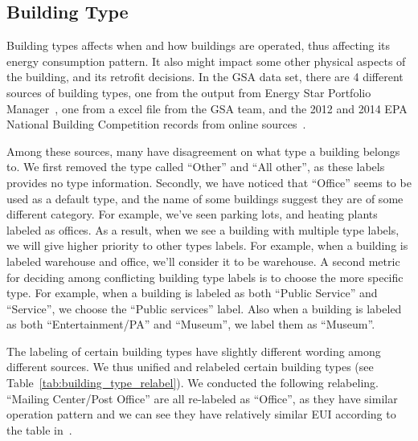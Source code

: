 \documentclass[12pt]{article}
\newcommand{\tref}[1]{Table~\ref{#1}}
\begin{document}
\subsection{Building Type} Building types affects when and how buildings are
operated, thus affecting its energy consumption pattern. It also might impact
some other physical aspects of the building, and its retrofit decisions. In the
GSA data set, there are 4 different sources of building types, one from the
output from Energy Star Portfolio Manager~\cite{portfolioManager2016}, one from
a excel file from the GSA team, and the 2012 and 2014 EPA National
Building Competition records from online
sources~\cite{nationalCompetitionEPA2012, nationalCompetitionEPA2014}.

Among these sources, many have disagreement on what type a building belongs to.
We first removed the type called ``Other'' and ``All other'', as these labels
provides no type information. Secondly, we have noticed that ``Office'' seems to
be used as a default type, and the name of some buildings suggest they are of
some different category. For example, we've seen parking lots, and heating
plants labeled as offices. As a result, when we see a building with multiple
type labels, we will give higher priority to other types labels. For example,
when a building is labeled warehouse and office, we'll consider it to be
warehouse. A second metric for deciding among conflicting building type labels
is to choose the more specific type. For example, when a building is labeled as
both ``Public Service'' and ``Service'', we choose the ``Public services''
label. Also when a building is labeled as both ``Entertainment/PA'' and
``Museum'', we label them as ``Museum''.

The labeling of certain building types have slightly different wording among
different sources. We thus unified and relabeled certain building types (see
\tref{tab:building_type_relabel}). We conducted the following relabeling.
``Mailing Center/Post Office'' are all re-labeled as ``Office'', as they have
similar operation pattern and we can see they have relatively similar EUI
according to the table in~\cite{euiPortfolioManager2018}.
\end{document}
